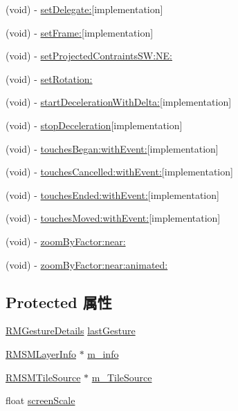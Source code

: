 \begin{DoxyCompactItemize}
\item 
(void) -\/ \hyperlink{interface_r_m_map_view_aea8bf2b4af3776170dc88d64d18c83bf}{set\-Delegate\-:}{\ttfamily  \mbox{[}implementation\mbox{]}}
\item 
(void) -\/ \hyperlink{interface_r_m_map_view_ab6e0beac983f26b40a756dda0498710e}{set\-Frame\-:}{\ttfamily  \mbox{[}implementation\mbox{]}}
\item 
(void) -\/ \hyperlink{interface_r_m_map_view_ae1cfbd98780426dfee0d008fc51651ea}{set\-Projected\-Contraints\-S\-W\-:\-N\-E\-:}
\item 
(void) -\/ \hyperlink{interface_r_m_map_view_a7532fc82b570c3e7f81d559717acec6e}{set\-Rotation\-:}
\item 
(void) -\/ \hyperlink{interface_r_m_map_view_a0634cae1a974936b4dde86e0392a6c33}{start\-Deceleration\-With\-Delta\-:}{\ttfamily  \mbox{[}implementation\mbox{]}}
\item 
(void) -\/ \hyperlink{interface_r_m_map_view_a85d36e113ba408b7beeb23a7354156c2}{stop\-Deceleration}{\ttfamily  \mbox{[}implementation\mbox{]}}
\item 
(void) -\/ \hyperlink{interface_r_m_map_view_ae441d7ab885d8dd18b794a68c113e4cb}{touches\-Began\-:with\-Event\-:}{\ttfamily  \mbox{[}implementation\mbox{]}}
\item 
(void) -\/ \hyperlink{interface_r_m_map_view_a464f5e8b6bdf7ce72e7e30e17972a047}{touches\-Cancelled\-:with\-Event\-:}{\ttfamily  \mbox{[}implementation\mbox{]}}
\item 
(void) -\/ \hyperlink{interface_r_m_map_view_a064931bc77db98015373c5d76faf9226}{touches\-Ended\-:with\-Event\-:}{\ttfamily  \mbox{[}implementation\mbox{]}}
\item 
(void) -\/ \hyperlink{interface_r_m_map_view_ace3bf92bf491646d749c27f55d2d7b34}{touches\-Moved\-:with\-Event\-:}{\ttfamily  \mbox{[}implementation\mbox{]}}
\item 
(void) -\/ \hyperlink{interface_r_m_map_view_a6003bcb4479e3ca7f2500db18f7ee8e8}{zoom\-By\-Factor\-:near\-:}
\item 
(void) -\/ \hyperlink{interface_r_m_map_view_a30bd6e4766b3bc224a6e214bb06ec8ca}{zoom\-By\-Factor\-:near\-:animated\-:}
\end{DoxyCompactItemize}
\subsection*{Protected 属性}
\begin{DoxyCompactItemize}
\item 
\hyperlink{struct_r_m_gesture_details}{R\-M\-Gesture\-Details} \hyperlink{interface_r_m_map_view_a9b8031da19d9d7850a4795cbbadefa5c}{last\-Gesture}
\item 
\hyperlink{interface_r_m_s_m_layer_info}{R\-M\-S\-M\-Layer\-Info} $\ast$ \hyperlink{interface_r_m_map_view_aca406dc0027962e811a73ee69ce5db68}{m\-\_\-info}
\item 
\hyperlink{interface_r_m_s_m_tile_source}{R\-M\-S\-M\-Tile\-Source} $\ast$ \hyperlink{interface_r_m_map_view_af89039ac8817690a1dceadd43b44ab8f}{m\-\_\-\-Tile\-Source}
\item 
float \hyperlink{interface_r_m_map_view_a51d17c6a26beb3cbd1bf51de4aa1f774}{screen\-Scale}
\end{DoxyCompactItemize}
